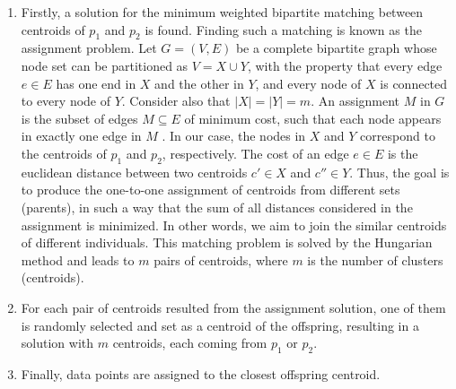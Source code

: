 \begin{enumerate}

	\item Firstly, a solution for the minimum weighted bipartite matching between centroids of $p_1$ and $p_2$ is found. Finding such a matching is known as the assignment problem. Let $G = (V, E)$ be a complete bipartite graph whose node set can be partitioned as $V = X \cup Y$, with the property that every edge $e \in E$ has one end in $X$ and the other in $Y$, and every node of $X$ is connected to every node of $Y$. Consider also that $|X| = |Y| = m$. An assignment $M$ in $G$ is the subset of edges $M \subseteq E$ of minimum cost, such that each node appears in exactly one edge in $M$ \cite{tardos}. In our case, the nodes in $X$ and $Y$ correspond to the centroids of $p_1$ and $p_2$, respectively. The cost of an edge $e \in E$ is the euclidean distance between two centroids $c' \in X$ and $c'' \in Y$. Thus, the goal is to produce the one-to-one assignment of centroids from different sets (parents), in such a way that the sum of all distances considered in the assignment is minimized. In other words, we aim to join the similar centroids of different individuals. This matching problem is solved by the Hungarian method \cite{Kuhn1955} and leads to $m$ pairs of centroids, where $m$ is the number of clusters (centroids).


	\item For each pair of centroids resulted from the assignment solution, one of them is randomly selected and set as a centroid of the offspring, resulting in a solution with $m$ centroids, each coming from $p_1$ or $p_2$.

	\item Finally, data points are assigned to the closest offspring centroid.
\end{enumerate}

